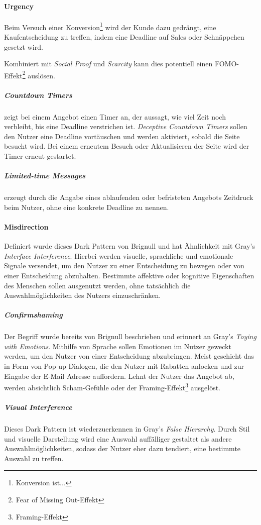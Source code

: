 \documentclass[a4paper]{article}
\begin{document}
\paragraph{Urgency}

Beim Versuch einer Konversion\footnote{\label{foot:3} Konversion ist...} wird der Kunde dazu gedrängt, eine Kaufentscheidung zu treffen, indem eine Deadline auf Sales oder Schnäppchen gesetzt wird. 

Kombiniert mit \textit{Social Proof} und \textit{Scarcity} kann dies potentiell einen FOMO-Effekt\footnote{\label{foot:4} Fear of Missing Out-Effekt} auslösen.

\subparagraph{Countdown Timers} zeigt bei einem Angebot einen Timer an, der aussagt, wie viel Zeit noch verbleibt, bis eine Deadline verstrichen ist. \textit{Deceptive Countdown Timers} sollen den Nutzer eine Deadline vortäuschen und werden aktiviert, sobald die Seite besucht wird. Bei einem erneutem Besuch oder Aktualisieren der Seite wird der Timer erneut gestartet.

\subparagraph{Limited-time Messages} erzeugt durch die Angabe eines ablaufenden oder befristeten Angebots Zeitdruck beim Nutzer, ohne eine konkrete Deadline zu nennen.

\paragraph{Misdirection}
Definiert wurde dieses Dark Pattern von Brignull und hat Ähnlichkeit mit Gray's \textit{Interface Interference}.
Hierbei werden visuelle, sprachliche und emotionale Signale versendet, um den Nutzer zu einer Entscheidung zu bewegen oder von einer Entscheidung abzuhalten. Bestimmte affektive oder kognitive Eigenschaften des Menschen sollen ausgenutzt werden, ohne tatsächlich die Auswahlmöglichkeiten des Nutzers einzuschränken.

\subparagraph{Confirmshaming}
Der Begriff wurde bereits von Brignull beschrieben und erinnert an Gray's \textit{Toying with Emotions}. 
Mithilfe von Sprache sollen Emotionen im Nutzer geweckt werden, um den Nutzer von einer Entscheidung abzubringen. Meist geschieht das in Form von Pop-up Dialogen, die den Nutzer mit Rabatten anlocken und zur Eingabe der E-Mail Adresse auffordern. Lehnt der Nutzer das Angebot ab, werden absichtlich Scham-Gefühle oder der Framing-Effekt\footnote{\label{foot:5} Framing-Effekt} ausgelöst.

\subparagraph{Visual Interference}
Dieses Dark Pattern ist wiederzuerkennen in Gray's \textit{False Hierarchy}. 
Durch Stil und visuelle Darstellung wird eine Auswahl auffälliger gestaltet als andere Auswahlmöglichkeiten, sodass der Nutzer eher dazu tendiert, eine bestimmte Auswahl zu treffen.
\end{document}

